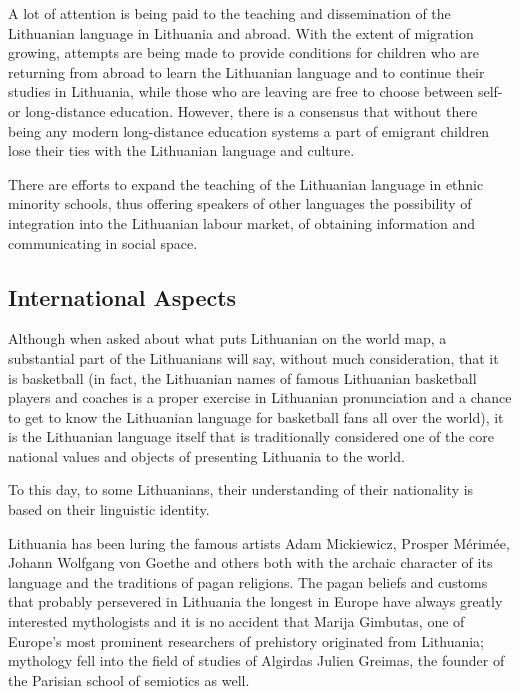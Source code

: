 \begin{multicols}{2}
A lot of attention is being paid to the teaching and dissemination of the Lithuanian language in Lithuania and abroad. With the extent of migration growing, attempts are being made to provide conditions for children who are returning from abroad to learn the Lithuanian language and to continue their studies in Lithuania, while those who are leaving are free to choose between self- or long-distance education.  However, there is a consensus that without there being any modern long-distance education systems a part of emigrant children lose their ties with the Lithuanian language and culture.

There are efforts to expand the teaching of the Lithuanian language in ethnic minority schools, thus offering speakers of other languages the possibility of integration into the Lithuanian labour market, of obtaining information and communicating in social space.

\subsection{International Aspects}

Although when asked about what puts Lithuanian on the world map, a substantial part of the Lithuanians will say, without much consideration, that it is basketball (in fact, the Lithuanian names of famous Lithuanian basketball players and coaches is a proper exercise in Lithuanian pronunciation and a chance to get to know the Lithuanian language for basketball fans all over the world), it is the Lithuanian language itself that is traditionally considered one of the core national values and objects of presenting Lithuania to the world.

    To this day, to some Lithuanians, their understanding of their nationality is based on their linguistic identity.


Lithuania has been luring the famous artists Adam Mickiewicz, Prosper Mérimée, Johann Wolfgang von Goethe and others both with the archaic character of its language and the traditions of pagan religions. The pagan beliefs and customs that probably persevered in Lithuania the longest in Europe have always greatly interested mythologists and it is no accident  that Marija Gimbutas, one of Europe’s most prominent researchers of  prehistory originated from Lithuania; mythology fell into the field of studies of Algirdas Julien Greimas, the founder of the Parisian school of semiotics as well.


\end{multicols}
